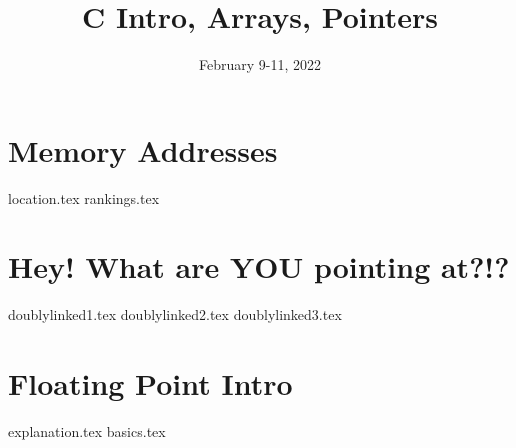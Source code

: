 \documentclass[11pt]{exam}
\title{C Intro, Arrays, Pointers}
\date{February 9-11, 2022}
\begin{document}
\maketitle

\section{Memory Addresses}
\begin{questions}
{location.tex}
{rankings.tex}
\end{questions}

\newpage
\section{Hey! What are YOU pointing at?!?}
\begin{questions}
{doublylinked1.tex}
{doublylinked2.tex}
{doublylinked3.tex}
\end{questions}
\newpage

\section{Floating Point Intro}
\begin{questions}
{explanation.tex}
{basics.tex}
\end{questions}
\newpage


\end{document}
